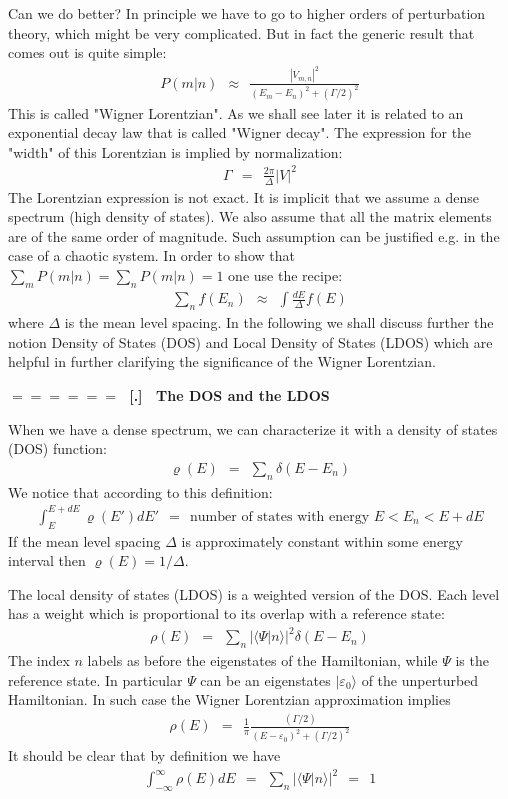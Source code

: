 \documentclass[onecolumn,fleqn]{revtex4}
\newcommand{\gdos}{\varrho} \newcommand{\EPS}{\mathcal{E}}
\newcommand{\beq}{\begin{eqnarray}}
\newcommand{\eeq}{\end{eqnarray}}
\renewcommand{\thesubsection}{\arabic{subsection}}
\renewcommand{\thesubsubsection}{\arabic{subsubsection}}
\newcommand{\sheadC}[1]
{
\addtocounter{subsubsection}{1}
\vspace{5mm}
{\Large\bf $=\!=\!=\!=\!=\!=\;$ [\thesubsection.\thesubsubsection] \ #1}  
\nopagebreak
\phantomsection
}
\begin{document}
Can we do better? In principle we have to go to 
higher orders of perturbation theory, which might 
be very complicated. But in fact the generic result 
that comes out is quite simple: 
\beq
P(m|n) \ \ \approx \ \
\frac{|V_{m,n}|^2}{(E_m-E_n)^2 + (\Gamma/2)^2 } 
\eeq
This is called "Wigner Lorentzian". 
As we shall see later it is related to an exponential 
decay law that is called "Wigner decay".
The expression for the "width" of this Lorentzian 
is implied by normalization:
\beq
\Gamma \ \ = \ \ \frac{2\pi}{\Delta} |V|^2 
\eeq
The Lorentzian expression is not exact. It is implicit 
that we assume a dense spectrum (high density of states).  
We also assume that all the matrix elements are of the same 
order of magnitude. Such assumption can be 
justified e.g. in the case of a chaotic system. 
In order to show that $\sum_m P(m|n) = \sum_n P(m|n) = 1$ one use the recipe:
\beq
\sum_{n} f(E_n) \ \ \approx \ \ \int \frac{dE}{\Delta} f(E) 
\eeq
where $\Delta$ is the mean level spacing.
In the following we shall discuss further 
the notion Density of States (DOS) and 
Local  Density of States (LDOS) which are 
helpful in further clarifying the significance 
of the Wigner Lorentzian.



\sheadC{The DOS and the LDOS} 

When we have a dense spectrum, we can characterize 
it with a density of states (DOS) function:
\beq
\gdos(E) \ \ = \ \ \sum_n \delta(E-E_n) 
\eeq
We notice that according to this definition:
\beq
\int^{E+dE}_E \gdos(E')dE' 
\ \ = \ \ \mbox{number of states with energy}\,\, E < E_n < E+dE 
\eeq
If the mean level spacing ${\Delta}$ is approximately 
constant within some energy interval then ${\gdos(E)=1/\Delta}$. 


The local density of states (LDOS) is a weighted version 
of the DOS. Each level has a weight which is proportional 
to its overlap with a reference state:  
\beq
\rho(E) \ \ = \ \ \sum_{n} |\langle \Psi | n \rangle|^2  \delta(E-E_n) 
\eeq
The index $n$ labels as before the eigenstates 
of the Hamiltonian, while $\Psi$ is the reference state.
In particular $\Psi$ can be an eigenstates $|\varepsilon_0 \rangle$ 
of the unperturbed Hamiltonian. In such case 
the Wigner Lorentzian approximation implies
\beq
\rho(E) \ \ = \ \ \frac{1}{\pi}\frac{(\Gamma/2)}{ (E-\varepsilon_0)^2 + (\Gamma/2)^2} 
\eeq
It should be clear that by definition we have 
\beq
\int_{-\infty}^{\infty} \rho(E) dE \ \ = \ \ \sum_{n} |\langle \Psi | n \rangle|^2  \ \ = \ \ 1 
\eeq
\end{document}

